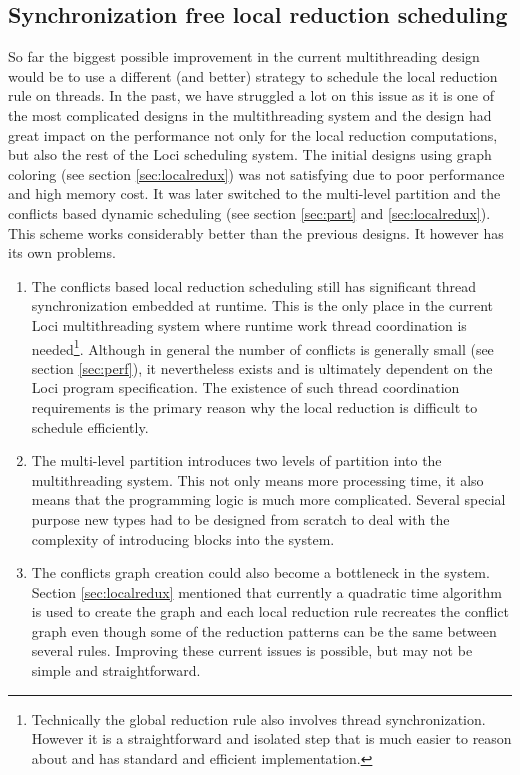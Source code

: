 \documentclass{article}
\begin{document}
\subsection{Synchronization free local reduction scheduling}
\label{sec:arrow}
So far the biggest possible improvement in the current multithreading
design would be to use a different (and better) strategy to schedule the
local reduction rule on threads.  In the past, we have struggled a lot
on this issue as it is one of the most complicated designs in the
multithreading system and the design had great impact on the performance
not only for the local reduction computations, but also the rest of the
Loci scheduling system.  The initial designs using graph coloring (see
section \ref{sec:localredux}) was not satisfying due to poor performance
and high memory cost.  It was later switched to the multi-level
partition and the conflicts based dynamic scheduling (see section
\ref{sec:part} and \ref{sec:localredux}).  This scheme works
considerably better than the previous designs.  It however has its own
problems.  

\begin{enumerate}

  \item The conflicts based local reduction scheduling still has
    significant thread synchronization embedded at runtime.  This is the
    only place in the current Loci multithreading system where runtime
    work thread coordination is needed\footnote{Technically the global
    reduction rule also involves thread synchronization.  However it is
    a straightforward and isolated step that is much easier to reason
  about and has standard and efficient implementation.}.  Although in
  general the number of conflicts is generally small (see section
  \ref{sec:perf}), it nevertheless exists and is ultimately dependent on
  the Loci program specification.  The existence of such thread
  coordination requirements is the primary reason why the local
  reduction is difficult to schedule efficiently.  

  \item The multi-level partition introduces two levels of partition
    into the multithreading system.  This not only means more processing
    time, it also means that the programming logic is much more
    complicated.  Several special purpose new types had to be designed
    from scratch to deal with the complexity of introducing blocks
    into the system.  

  \item The conflicts graph creation could also become a bottleneck in
    the system.  Section \ref{sec:localredux} mentioned that currently a
    quadratic time algorithm is used to create the graph and each local
    reduction rule recreates the conflict graph even though some of the
    reduction patterns can be the same between several rules.  Improving
    these current issues is possible, but may not be simple and
    straightforward.

\end{enumerate}
\end{document}
